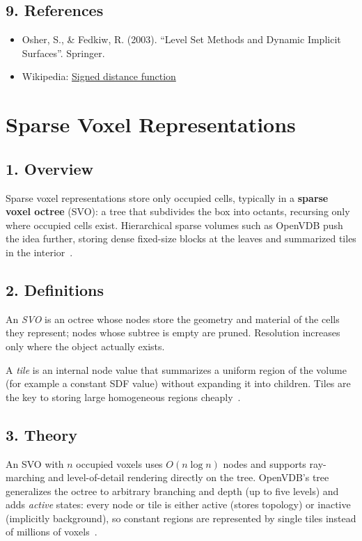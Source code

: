 \subsection{9. References}
\begin{itemize}
    \item Osher, S., \& Fedkiw, R. (2003). ``Level Set Methods and Dynamic Implicit Surfaces''. Springer.
    \item Wikipedia: \href{https://en.wikipedia.org/wiki/Signed_distance_function}{Signed distance function}
\end{itemize}

\section{Sparse Voxel Representations}
\label{sec:sparse_voxel}

\subsection{1. Overview}
Sparse voxel representations store only occupied cells, typically in a
\textbf{sparse voxel octree} (SVO): a tree that
subdivides the box into octants, recursing only where occupied cells
exist. Hierarchical sparse volumes such as OpenVDB push the idea further,
storing dense fixed-size blocks at the leaves and summarized tiles in the
interior~\cite{museth2013}.

\subsection{2. Definitions}

\begin{definition}\label{def:svo}
An \emph{SVO} is an octree whose nodes store the geometry and material of the
cells they represent; nodes whose subtree is empty are pruned. Resolution
increases only where the object actually exists.
\end{definition}

\begin{definition}[Tile]\label{def:voxel_tile}
A \emph{tile} is an internal node value that summarizes a uniform region of
the volume (for example a constant SDF value) without expanding it into
children. Tiles are the key to storing large homogeneous regions cheaply~\cite{museth2013}.
\end{definition}

\subsection{3. Theory}
An SVO with $n$ occupied voxels uses $O(n \log n)$ nodes and supports
ray-marching and level-of-detail rendering directly on the tree. OpenVDB's
tree generalizes the octree to arbitrary branching and depth (up to five
levels) and adds \emph{active} states: every node or tile is either active
(stores topology) or inactive (implicitly background), so constant regions
are represented by single tiles instead of millions of voxels~\cite{museth2013}.

